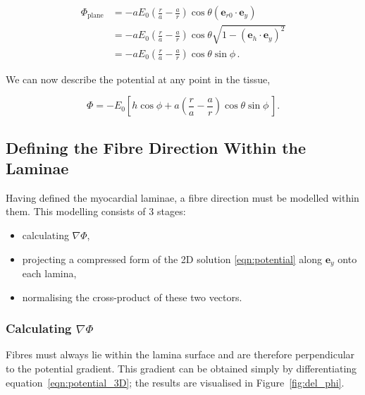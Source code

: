   \begin{align}
    \Phi_{\text{plane}} &= -aE_0\left( \frac{r}{a} - \frac{a}{r} \right) \cos \theta \left(\mathbf{e}_{r0} \cdot \mathbf{e}_y \right) \\
    &= -aE_0\left( \frac{r}{a} - \frac{a}{r} \right) \cos \theta \sqrt{ 1 - \left( \mathbf{e}_h \cdot \mathbf{e}_y \right)^2 } \\
    &= -aE_0\left( \frac{r}{a} - \frac{a}{r} \right) \cos \theta \sin \phi \, .
  \end{align}
  
  We can now describe the potential at any point in the tissue,
  
  \begin{equation}
    \Phi = -E_0\left[ h \cos \phi + a \left( \frac{r}{a} - \frac{a}{r} \right) \cos \theta \sin \phi \, \right].
    \label{eqn:potential_3D}
  \end{equation}
  

\subsection{Defining the Fibre Direction Within the Laminae}
\label{sec:defining_the_fibre_direction_within_the_laminae}
  Having defined the myocardial laminae, a fibre direction must be modelled within them. This modelling consists of 3 stages:
  
  \begin{itemize}
    \item calculating $\nabla\Phi$,
    \item projecting a compressed form of the 2D solution \ref{eqn:potential} along $\mathbf{e}_y$ onto each lamina,
    \item normalising the cross-product of these two vectors.
  \end{itemize}
  
  \subsubsection{Calculating $\nabla\Phi$}
  \label{sub:calculating_nablaphi}
    Fibres must always lie within the lamina surface and are therefore perpendicular to the potential gradient. This gradient can be obtained simply by differentiating equation~\ref{eqn:potential_3D}; the results are visualised in Figure~\ref{fig:del_phi}.
    
